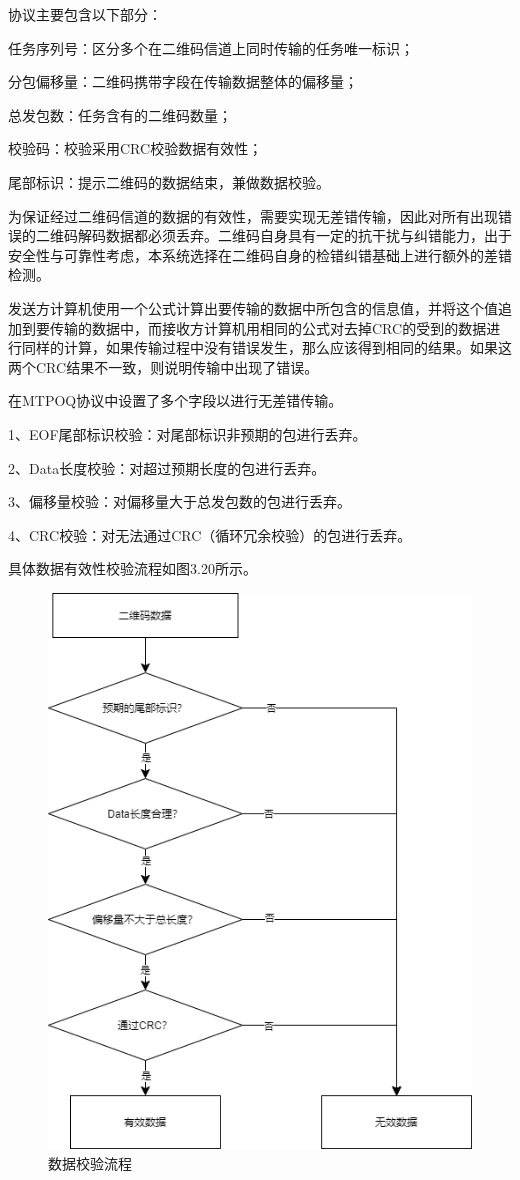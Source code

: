 协议主要包含以下部分：

任务序列号：区分多个在二维码信道上同时传输的任务唯一标识；

分包偏移量：二维码携带字段在传输数据整体的偏移量；

总发包数：任务含有的二维码数量；

校验码：校验采用CRC校验数据有效性；

尾部标识：提示二维码的数据结束，兼做数据校验。

为保证经过二维码信道的数据的有效性，需要实现无差错传输，因此对所有出现错误的二维码解码数据都必须丢弃。二维码自身具有一定的抗干扰与纠错能力，出于安全性与可靠性考虑，本系统选择在二维码自身的检错纠错基础上进行额外的差错检测。

发送方计算机使用一个公式计算出要传输的数据中所包含的信息值，并将这个值追加到要传输的数据中，而接收方计算机用相同的公式对去掉CRC的受到的数据进行同样的计算，如果传输过程中没有错误发生，那么应该得到相同的结果。如果这两个CRC结果不一致，则说明传输中出现了错误。

在MTPOQ协议中设置了多个字段以进行无差错传输。

1、EOF尾部标识校验：对尾部标识非预期的包进行丢弃。

2、Data长度校验：对超过预期长度的包进行丢弃。

3、偏移量校验：对偏移量大于总发包数的包进行丢弃。

4、CRC校验：对无法通过CRC（循环冗余校验）的包进行丢弃。

具体数据有效性校验流程如图3.20所示。

\begin{figure}[!htbp]
\centering
\includegraphics[scale=0.6]{figures/CRC_Check.png}
\caption{数据校验流程}
\end{figure}

